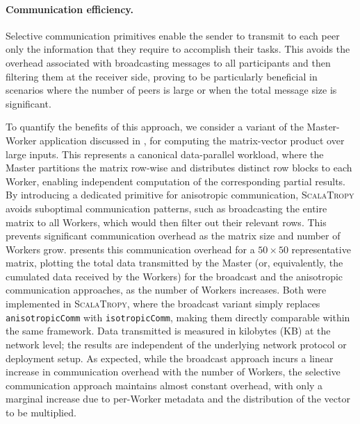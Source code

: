 \documentclass[runningheads]{llncs}
\newcommand{\ourLang}{\textsc{ScalaTropy}}
\newcommand{\code}[1]{\lstinline[style=scala3,basicstyle=\ttfamily\small\color{vscLightText}]{#1}}
\newcommand{\diff}[1]{{#1}}
\begin{document}
\paragraph{Communication efficiency.}
Selective communication primitives enable the sender to transmit to each peer only the information that they require to accomplish their tasks.
%
This avoids the overhead associated with broadcasting messages to all participants and then filtering them at the receiver side, 
proving to be particularly beneficial in scenarios where the number of peers is large or when the total message size is significant.

To quantify the benefits of this approach, 
we consider a variant of the Master-Worker application discussed in ,
for computing the matrix-vector product over large inputs.
%
This represents a canonical data-parallel workload,
where the Master partitions the matrix row-wise and distributes distinct row blocks to each Worker,
enabling independent computation of the corresponding partial results.
%
%
\diff{By introducing a dedicated primitive for anisotropic communication, \ourLang{} avoids suboptimal communication patterns, such as broadcasting}
%
the entire matrix to all Workers, 
which would then filter out their relevant rows.
%
This prevents significant communication overhead as the matrix size and number of Workers grow.
%
 presents this communication overhead for a $50 \times 50$ \diff{representative} matrix, 
plotting the total data transmitted by the Master 
(or, equivalently, the cumulated data received by the Workers)
\diff{for the broadcast and the anisotropic communication approaches},
as the number of Workers increases.
%
\diff{
  Both were implemented in \ourLang{}, where the broadcast variant simply replaces \code{anisotropicComm} with \code{isotropicComm}, making them directly comparable within the same framework.
  Data transmitted is measured in kilobytes (KB) at the network level; the results are independent of the underlying network protocol or deployment setup.
}
%
As expected, while the broadcast approach incurs a linear increase in communication overhead with the number of Workers,
the selective communication approach maintains almost constant overhead, with only a marginal increase due to per-Worker metadata and the distribution of the vector to be multiplied.
\end{document}
